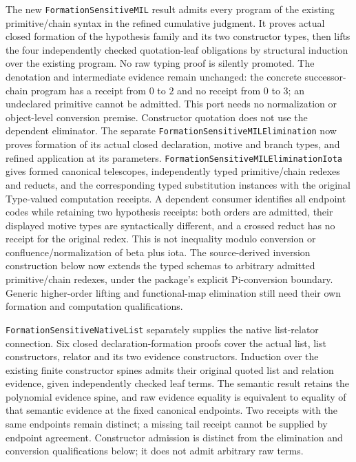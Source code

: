 \documentclass[11pt]{article}
\theoremstyle{definition}
\theoremstyle{remark}
\begin{document}
The new \nolinkurl{FormationSensitiveMIL} result admits every program of
the existing primitive/chain syntax in the refined cumulative judgment.
It proves actual closed formation of the hypothesis family and its two
constructor types, then lifts the four independently checked quotation-leaf
obligations by structural induction over the existing program. No raw typing
proof is silently promoted. The denotation and intermediate evidence remain
unchanged: the concrete successor-chain program has a receipt from $0$ to $2$
and no receipt from $0$ to $3$; an undeclared primitive cannot be admitted.
This port needs no normalization or object-level conversion premise.
Constructor quotation does not use the dependent eliminator. The separate
\nolinkurl{FormationSensitiveMILElimination} now proves formation of its actual
closed declaration, motive and branch types, and refined application at its
parameters. \nolinkurl{FormationSensitiveMILEliminationIota} gives formed
canonical telescopes, independently typed primitive/chain redexes and reducts,
and the corresponding typed substitution instances with the original
Type-valued computation receipts. A dependent consumer identifies all endpoint
codes while retaining two hypothesis receipts: both orders are admitted, their
displayed motive types are syntactically different, and a crossed reduct has
no receipt for the original redex. This is not inequality modulo conversion
or confluence/normalization of beta plus iota. The source-derived inversion
construction below now extends the typed schemas to arbitrary admitted
primitive/chain redexes, under the package's explicit Pi-conversion boundary.
Generic higher-order lifting and functional-map elimination still need their
own formation and computation qualifications.

\nolinkurl{FormationSensitiveNativeList} separately supplies the native
list-relator connection. Six closed declaration-formation proofs cover the
actual list, list constructors, relator and its two evidence constructors.
Induction over the existing finite constructor spines admits their original
quoted list and relation evidence, given independently checked leaf terms.
The semantic result retains the polynomial evidence spine, and raw evidence
equality is equivalent to equality of that semantic evidence at the fixed
canonical endpoints. Two receipts with the same endpoints remain distinct;
a missing tail receipt cannot be supplied by endpoint agreement. Constructor
admission is distinct from the elimination and conversion qualifications below;
it does not admit arbitrary raw terms.
\end{document}

